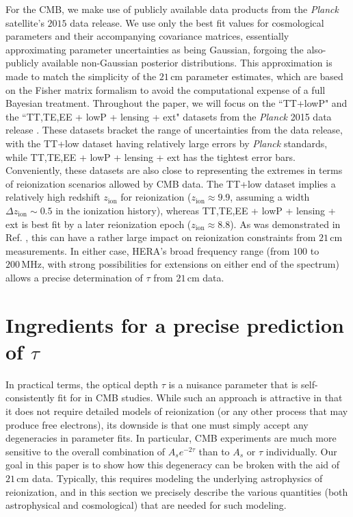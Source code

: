 \documentclass[twocolumn,aps,prd,nofootinbib,showpacs]{revtex4-1}
\begin{document}
For the CMB, we make use of publicly available data products from the \emph{Planck} satellite's $2015$ data release. We use only the best fit values for cosmological parameters and their accompanying covariance matrices, essentially approximating parameter uncertainties as being Gaussian, forgoing the also-publicly available non-Gaussian posterior distributions. This approximation is made to match the simplicity of the $21\,\textrm{cm}$ parameter estimates, which are based on the Fisher matrix formalism to avoid the computational expense of a full Bayesian treatment. Throughout the paper, we will focus on the ``TT+lowP" and the ``TT,TE,EE + lowP + lensing + ext" datasets from the \emph{Planck} 2015 data release \cite{Planck2015parameters,Planck2015likelihood}. These datasets bracket the range of uncertainties from the data release, with the TT+low dataset having relatively large errors by \emph{Planck} standards, while TT,TE,EE + lowP + lensing + ext has the tightest error bars. Conveniently, these datasets are also close to representing the extremes in terms of reionization scenarios allowed by CMB data. The TT+low dataset implies a relatively high redshift $z_\textrm{ion}$ for reionization ($z_\textrm{ion} \approx 9.9$, assuming a width $\Delta z_\textrm{ion} \sim 0.5$ in the ionization history), whereas TT,TE,EE + lowP + lensing + ext is best fit by a later reionization epoch ($z_\textrm{ion} \approx 8.8$). As was demonstrated in Ref. \cite{Liu_in_prep}, this can have a rather large impact on reionization constraints from $21\,\textrm{cm}$ measurements. In either case, HERA's broad frequency range (from $100$ to $200\,\textrm{MHz}$, with strong possibilities for extensions on either end of the spectrum) allows a precise determination of $\tau$ from $21\,\textrm{cm}$ data.

\section{Ingredients for a precise prediction of $\tau$ }
\label{sec:Ingredients}

In practical terms, the optical depth $\tau$ is a nuisance parameter that is self-consistently fit for in CMB studies. While such an approach is attractive in that it does not require detailed models of reionization (or any other process that may produce free electrons), its downside is that one must simply accept any degeneracies in parameter fits. In particular, CMB experiments are much more sensitive to the overall combination of $A_s e^{-2\tau}$ than to $A_s$ or $\tau$ individually. Our goal in this paper is to show how this degeneracy can be broken with the aid of $21\,\textrm{cm}$ data. Typically, this requires modeling the underlying astrophysics of reionization, and in this section we precisely describe the various quantities (both astrophysical and cosmological) that are needed for such modeling.
\end{document}
